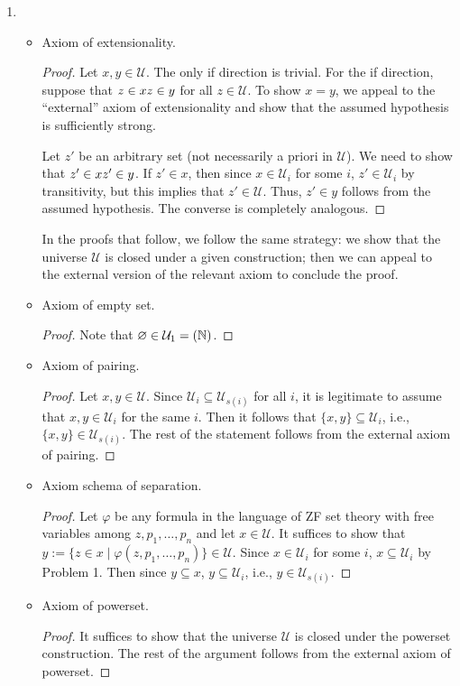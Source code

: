 \documentclass[a4paper]{article}
\newcommand{\N}{\mathbb{N}}
\let\P\relax
\newcommand{\P}{\mathcal{P}}
\newcommand{\U}{\mathcal{U}}
\let\iff\relax
\newcommand{\iff}{\Leftrightarrow}
\begin{document}
\begin{enumerate}
\item
  \begin{itemize}
  \item Axiom of extensionality.
    \begin{proof}
      Let $x,y \in \U$.
      The only if direction is trivial.
      For the if direction, suppose that $z \in x \iff z \in y$ for all $z \in \U$.
      To show $x = y$, we appeal to the ``external'' axiom of extensionality and show that the assumed hypothesis is sufficiently strong.

      Let $z'$ be an arbitrary set (not necessarily a priori in $\U$).
      We need to show that $z' \in x \iff z' \in y$.
      If $z' \in x$, then since $x \in \U_{i}$ for some $i$, $z' \in \U_{i}$ by transitivity, but this implies that $z' \in \U$.
      Thus, $z' \in y$ follows from the assumed hypothesis.
      The converse is completely analogous.
    \end{proof}
    In the proofs that follow, we follow the same strategy: we show that the universe $\U$ is closed under a given construction; then we can appeal to the external version of the relevant axiom to conclude the proof.
  \item Axiom of empty set.
    \begin{proof}
      Note that $\varnothing \in \U_{1} = \P(\N)$.
    \end{proof}
  \item Axiom of pairing.
    \begin{proof}
      Let $x,y \in \U$.
      Since $\U_{i} \subseteq \U_{s(i)}$ for all $i$, it is legitimate to assume that $x,y \in \U_{i}$ for the same $i$.
      Then it follows that $\{x,y\} \subseteq \U_{i}$, i.e., $\{x,y\} \in \U_{s(i)}$.
      The rest of the statement follows from the external axiom of pairing.
    \end{proof}
  \item Axiom schema of separation.
    \begin{proof}
      Let $\varphi$ be any formula in the language of ZF set theory with free variables among $z,p_{1},\ldots,p_{n}$ and let $x \in \U$.
      It suffices to show that $y := \{z \in x \mid \varphi(z,p_{1},\ldots,p_{n})\} \in \U$.
      Since $x \in \U_{i}$ for some $i$, $x \subseteq \U_{i}$ by Problem 1.
      Then since $y \subseteq x$, $y \subseteq \U_{i}$, i.e., $y \in \U_{s(i)}$.
    \end{proof}
  \item Axiom of powerset.
    \begin{proof}
      It suffices to show that the universe $\U$ is closed under the powerset construction.
      The rest of the argument follows from the external axiom of powerset.


\end{proof}
\end{itemize}
\end{enumerate}
\end{document}
